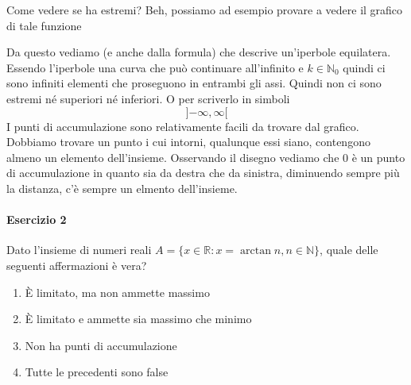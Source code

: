 Come vedere se ha estremi? Beh, possiamo ad esempio provare a vedere il grafico di tale funzione
\begin{center}
\end{center}
Da questo vediamo (e anche dalla formula) che descrive un'iperbole equilatera. Essendo l'iperbole una
curva che può continuare all'infinito e $k\in\mathbb{N}_0$ quindi ci sono infiniti elementi che 
proseguono in entrambi gli assi. Quindi non ci sono estremi né superiori né inferiori. O per scriverlo
in simboli
\begin{equation*}
  {]{-\infty},{\infty}[}
\end{equation*}
I punti di accumulazione sono relativamente facili da trovare dal grafico. Dobbiamo trovare un punto
i cui intorni, qualunque essi siano, contengono almeno un elemento dell'insieme. Osservando il disegno
vediamo che $0$ è un punto di accumulazione in quanto sia da destra che da sinistra, diminuendo sempre
più la distanza, c'è sempre un elmento dell'insieme.

\paragraph{Esercizio 2}
Dato l'insieme di numeri reali $A=\{x\in\mathbb{R}: x= \arctan n, n\in\mathbb{N}\}$, quale delle
seguenti affermazioni è vera?
\begin{enumerate}
  \item È limitato, ma non ammette massimo
  \item È limitato e ammette sia massimo che minimo
  \item Non ha punti di accumulazione
  \item Tutte le precedenti sono false
\end{enumerate}
\divisor


